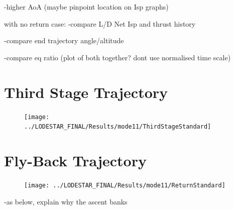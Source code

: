 -higher AoA (maybe pinpoint location on Isp graphs)

with no return case:
-compare L/D Net Isp and thrust history

-compare end trajectory angle/altitude 

-compare eq ratio (plot of both together? dont use normalised time scale)


\section{Third Stage Trajectory}
\begin{figure}
\centering
\texttt{[image: ../LODESTAR\_FINAL/Results/mode11/ThirdStageStandard]}
\caption{}
\label{fig:ThirdStageStandard}
\end{figure}


\section{Fly-Back Trajectory}

\begin{figure}
	\centering
	\texttt{[image: ../LODESTAR\_FINAL/Results/mode11/ReturnStandard]}
	\caption{}
	\label{fig:ReturnStandard}
\end{figure}

-as below, explain why the ascent banks




